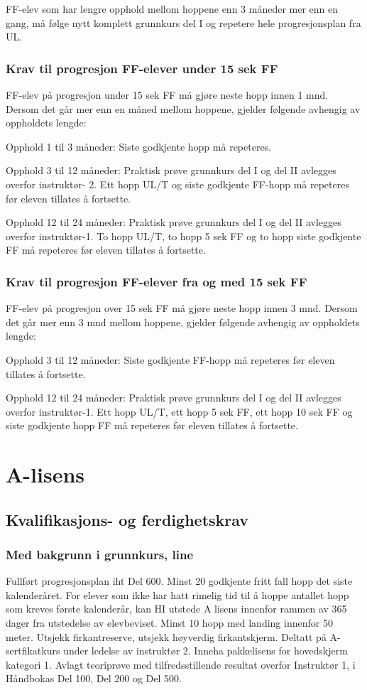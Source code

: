 FF-elev som har lengre opphold mellom hoppene enn 3 måneder mer enn en gang, må følge nytt komplett grunnkurs del I og repetere hele progresjonsplan fra UL.

\subsubsection{Krav til progresjon FF-elever under 15 sek FF}
FF-elev på progresjon under 15 sek FF må gjøre neste hopp innen 1 mnd. Dersom det går mer enn en måned mellom hoppene, gjelder følgende avhengig av oppholdets lengde:

Opphold 1 til 3 måneder: Siste godkjente hopp må repeteres.

Opphold 3 til 12 måneder: Praktisk prøve grunnkurs del I og del II avlegges overfor instruktør- 2. Ett hopp UL/T og siste godkjente FF-hopp må repeteres før eleven tillates å fortsette.

Opphold 12 til 24 måneder: Praktisk prøve grunnkurs del I og del II avlegges overfor instruktør-1. To hopp UL/T, to hopp 5 sek FF og to hopp siste godkjente FF må repeteres før eleven tillates å fortsette.

\subsubsection{Krav til progresjon FF-elever fra og med 15 sek FF}
FF-elev på progresjon over 15 sek FF må gjøre neste hopp innen 3 mnd. Dersom det går mer enn 3 mnd mellom hoppene, gjelder følgende avhengig av oppholdets lengde:

Opphold 3 til 12 måneder: Siste godkjente FF-hopp må repeteres før eleven tillates å fortsette.

Opphold 12 til 24 måneder: Praktisk prøve grunnkurs del I og del II avlegges overfor instruktør-1. Ett hopp UL/T, ett hopp 5 sek FF, ett hopp 10 sek FF og siste godkjente hopp FF må repeteres før eleven tillates å fortsette.

\section{A-lisens}
\subsection{Kvalifikasjons- og ferdighetskrav}
\subsubsection{Med bakgrunn i grunnkurs, line}
Fullført progresjonsplan iht Del 600. Minst 20 godkjente fritt fall hopp det siste kalenderåret. For elever som ikke har hatt rimelig tid til å hoppe antallet hopp som kreves første kalenderår, kan HI utstede A lisens innenfor rammen av 365 dager fra utstedelse av elevbeviset. Minst 10 hopp med landing innenfor 50 meter. Utsjekk firkantreserve, utsjekk høyverdig firkantskjerm. Deltatt på A-sertfikatkurs under ledelse av instruktør 2. Inneha pakkelisens for hovedskjerm kategori 1. Avlagt teoriprøve med tilfredsstillende resultat overfor Instruktør 1, i Håndbokas Del 100, Del 200 og Del 500.

